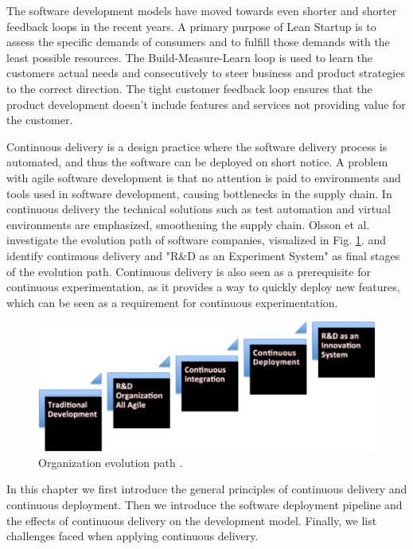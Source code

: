 \documentclass[english, grading]{tktltiki2}
\theoremstyle{definition}
\theoremstyle{remark}
\begin{document}
The software development models have moved towards even shorter and shorter feedback loops in the recent years. A primary purpose of Lean Startup is to assess the specific demands of consumers and to fulfill those demands with the least possible resources. The Build-Measure-Learn loop is used to learn the customers actual needs and consecutively to steer business and product strategies to the correct direction. The tight customer feedback loop ensures that the product development doesn't include features and services not providing value for the customer. 

Continuous delivery is a design practice where the software delivery process is automated, and thus the software can be deployed on short notice. A problem with agile software development is that no attention is paid to environments and tools used in software development, causing bottlenecks in the supply chain. In continuous delivery the technical solutions such as test automation and virtual environments are emphasized, smoothening the supply chain. Olsson et al. investigate the evolution path of software companies, visualized in Fig. \ref{fig1}. and identify continuous delivery and "R\&D as an Experiment System" as final stages \cite{olsson2012climbing} of the evolution path. Continuous delivery is also seen as a prerequisite for continuous experimentation, as it provides a way to quickly deploy new features, which can be seen as a requirement for continuous experimentation.

\begin{figure}[h]
	\centering
	\includegraphics[width=5.0in]{stairway.png}
	\caption{Organization evolution path \cite{olsson2012climbing}.}
	\label{fig1}
\end{figure}

In this chapter we first introduce the general principles of continuous delivery and continuous deployment. Then we introduce the software deployment pipeline and the effects of continuous delivery on the development model. Finally, we list challenges faced when applying continuous delivery.
\end{document}
